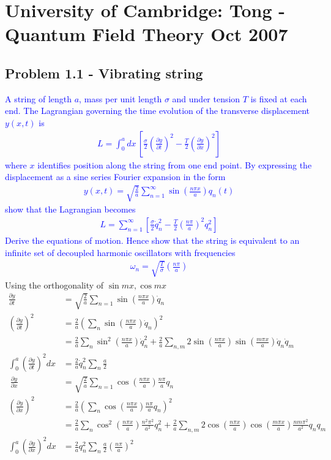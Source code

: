 \documentclass[../main.tex]{subfiles}
\begin{document}
\newpage
\section{University of Cambridge: {\sc Tong} - Quantum Field Theory Oct 2007}
\subsection{Problem 1.1 - Vibrating string}
\textcolor{blue}{
A string of length $a$, mass per unit length $\sigma$ and under tension $T$ is fixed at
each end. The Lagrangian governing the time evolution of the transverse displacement
$y(x,t)$ is
\begin{align}
L=\int_0^a dx\,\left[\frac{\sigma}{2}\left(\frac{\partial y}{\partial t}\right)^2-\frac{T}{2}\left(\frac{\partial y}{\partial x}\right)^2\right]
\end{align}
where $x$ identifies position along the string from one end point. By expressing the displacement as a sine series Fourier expansion in the form
\begin{align}
y(x,t)=\sqrt{\frac{2}{a}}\sum_{n=1}^\infty\sin\left(\frac{n\pi x}{a}\right)q_n(t)
\end{align}
show that the Lagrangian becomes
\begin{align}
L=\sum_{n=1}^\infty\left[\frac{\sigma}{2}\dot{q}_n^2-\frac{T}{2}\left(\frac{n\pi}{a}\right)^2q_n^2\right]
\end{align}
Derive the equations of motion. Hence show that the string is equivalent to an infinite set of decoupled harmonic oscillators with frequencies
\begin{align}
\omega_n=\sqrt{\frac{T}{\sigma}}\left(\frac{n\pi}{a}\right)
\end{align}
}
Using the orthogonality of $\sin mx, \cos mx$
\begin{align}
\frac{\partial y}{\partial t}
&=\sqrt{\frac{2}{a}}\sum_{n=1}\sin\left(\frac{n\pi x}{a}\right)\dot{q}_n\\
\left(\frac{\partial y}{\partial t}\right)^2
&=\frac{2}{a}\left(\sum_n\sin\left(\frac{n\pi x}{a}\right)\dot{q}_n\right)^2\\
&=\frac{2}{a}\sum_{n}\sin^2\left(\frac{n\pi x}{a}\right)\dot{q}_n^2+\frac{2}{a}\sum_{n,m}2\sin\left(\frac{n\pi x}{a}\right)\sin\left(\frac{m\pi x}{a}\right)\dot{q}_n\dot{q}_m\\
\int_0^a \left(\frac{\partial y}{\partial t}\right)^2dx
&=\frac{2}{a}\dot{q}_n^2\sum_{n}\frac{a}{2}\\\
%
\frac{\partial y}{\partial x}
&=\sqrt{\frac{2}{a}}\sum_{n=1}\cos\left(\frac{n\pi x}{a}\right)\frac{n\pi}{a}q_n\\
\left(\frac{\partial y}{\partial x}\right)^2
&=\frac{2}{a}\left(\sum_n\cos\left(\frac{n\pi x}{a}\right)\frac{n\pi}{a}q_n\right)^2\\
&=\frac{2}{a}\sum_n\cos^2\left(\frac{n\pi x}{a}\right)\frac{n^2\pi^2}{a^2}q_n^2+\frac{2}{a}\sum_{n,m}2\cos\left(\frac{n\pi x}{a}\right)\cos\left(\frac{m\pi x}{a}\right)\frac{nm\pi^2}{a^2}q_nq_m\\
\int_0^a \left(\frac{\partial y}{\partial x}\right)^2dx
&=\frac{2}{a}q_n^2\sum_{n}\frac{a}{2}\left(\frac{n\pi}{a}\right)^2
\end{align}
\end{document}
